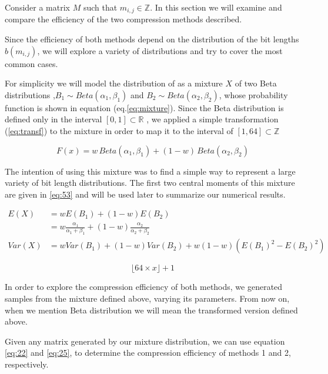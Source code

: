 \documentclass[10pt]{article}
\begin{document}
Consider a matrix $M$ such that $m_{i,j} \in \mathbb{Z}$. In this section we will examine and compare the efficiency of the two compression methods described.

Since the efficiency of both methods depend on the distribution of the bit lengths $b(m_{i,j})$, we will explore a variety of distributions and try to cover the most common cases.

For simplicity we will model the distribution of  as a mixture $X$ of two Beta distributions ,$ B_1 \sim Beta(\alpha_1,\beta_1)$ and $B_2 \sim Beta(\alpha_2,\beta_2)$, whose probability function is shown in equation (eq.\ref{eq:mixture}). Since the Beta distribution is defined only in the interval $[0,1] \subset \mathbb{R}$ , we applied a simple transformation (\ref{eq:transf}) to the mixture in order to map it to the interval of $[1,64] \subset \mathbb{Z}$

\begin{equation}\label{eq:mixture}
 F(x) =  w \, Beta(\alpha_1,\beta_1) + (1-w)\,Beta(\alpha_2,\beta_2)
\end{equation}

The intention of using this mixture was to find a simple way to represent a large variety of bit length distributions. The first two central moments of this mixture are given in \ref{eq:53} and will be used later to summarize our numerical results.

\begin{align}\label{eq:53}
 E(X) &= w E(B_1) + (1-w) E(B_2) \nonumber \\
 &= w \frac{\alpha_1}{\alpha_1+\beta_1} + (1-w)\frac{\alpha_2}{\alpha_2+\beta_2}\nonumber \\
 Var(X) &= w Var(B_1) + (1-w) Var(B_2) + w (1-w) (E(B_1)^2 - E(B_2)^2)
\end{align}

\begin{equation}\label{eq:transf}
   \lfloor 64 \times x \rfloor + 1
\end{equation}

In order to explore the compression efficiency of both methods, we generated samples from the mixture defined above, varying its parameters. From now on, when we mention Beta distribution we will mean the transformed version defined above.

Given any matrix generated by our mixture distribution, we can use equation \ref{eq:22} and \ref{eq:25}, to determine the compression efficiency of methods 1 and 2, respectively. 
\end{document}
